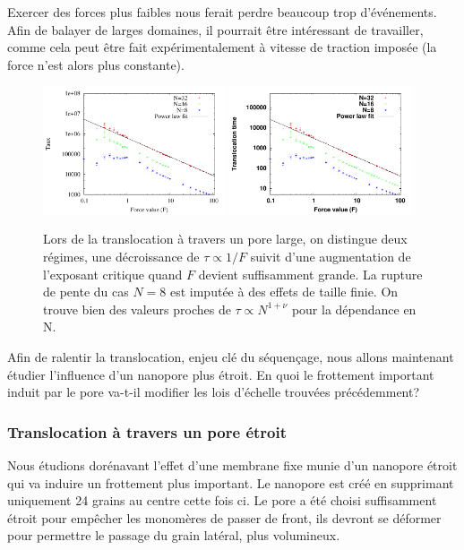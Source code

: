 \documentclass[a4paper,11pt]{article}
\begin{document}
Exercer des forces plus faibles nous ferait perdre beaucoup trop d'événements. Afin de balayer de larges domaines, il pourrait être intéressant de travailler, comme cela peut être fait expérimentalement à vitesse de traction imposée (la force n'est alors plus constante).

\begin{figure}[H]
\begin{center}
\includegraphics[width=0.48\textwidth]{translocfholebigger.pdf} \includegraphics[width=0.48\textwidth]{translocholebigger.pdf}

\caption{Lors de la translocation à travers un pore large, on distingue deux régimes, une décroissance de $\tau \propto 1/F$ suivit d'une augmentation de l'exposant critique quand $F$ devient suffisamment grande. La rupture de pente du cas $N=8$ est imputée à des effets de taille finie. On trouve bien des valeurs proches de $\tau \propto N^{1+\nu}$ pour la dépendance en N.}
\label{holebigger}
\end{center}
\end{figure}

Afin de ralentir la translocation, enjeu clé du séquençage, nous allons maintenant étudier l'influence d'un nanopore plus étroit. En quoi le frottement important induit par le pore va-t-il modifier les lois d'échelle trouvées précédemment?


\subsubsection*{Translocation à travers un pore étroit}
Nous étudions dorénavant l'effet d'une membrane fixe munie d'un nanopore étroit qui va induire un frottement plus important. Le nanopore est créé en supprimant uniquement 24 grains au centre cette fois ci. Le pore a été choisi suffisamment étroit pour empêcher les monomères de passer de front, ils devront se déformer pour permettre le passage du grain latéral, plus volumineux.\\
\end{document}
